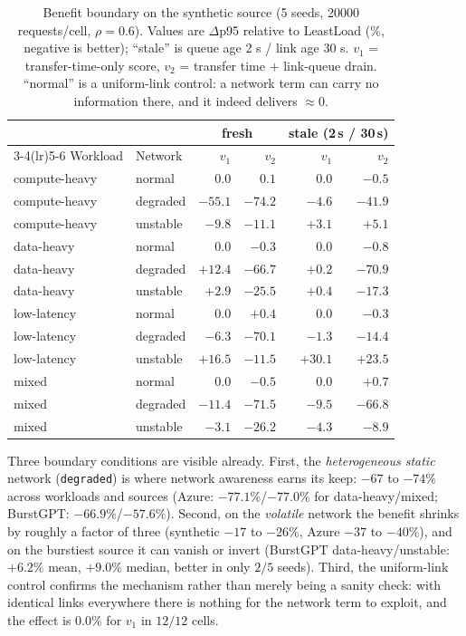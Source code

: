 \begin{table}[t]
\centering
\caption{Benefit boundary on the synthetic source (5 seeds, 20000 requests/cell,
$\rho=0.6$). Values are $\Delta$p95 relative to LeastLoad (\%, negative is better);
``stale'' is queue age 2 s / link age 30 s. $v_1$ = transfer-time-only
score, $v_2$ = transfer time $+$ link-queue drain. ``normal'' is a uniform-link control: a
network term can carry no information there, and it indeed delivers $\approx0$.}
\label{tab:rq1main}
\small
\begin{tabular}{@{}llrrrr@{}}
\toprule
& & \multicolumn{2}{c}{fresh} & \multicolumn{2}{c}{stale (2\,s / 30\,s)} \\
\cmidrule(lr){3-4}\cmidrule(lr){5-6}
Workload & Network & $v_1$ & $v_2$ & $v_1$ & $v_2$ \\
\midrule
compute-heavy & normal   & $0.0$   & $0.1$   & $0.0$   & $-0.5$ \\
compute-heavy & degraded & $-55.1$ & $-74.2$ & $-4.6$  & $-41.9$ \\
compute-heavy & unstable & $-9.8$  & $-11.1$ & $+3.1$  & $+5.1$ \\
data-heavy    & normal   & $0.0$   & $-0.3$  & $0.0$   & $-0.8$ \\
data-heavy    & degraded & $\mathbf{+12.4}$ & $\mathbf{-66.7}$ & $+0.2$ & $-70.9$ \\
data-heavy    & unstable & $+2.9$  & $-25.5$ & $+0.4$  & $-17.3$ \\
low-latency   & normal   & $0.0$   & $+0.4$  & $0.0$   & $-0.3$ \\
low-latency   & degraded & $-6.3$  & $-70.1$ & $-1.3$  & $-14.4$ \\
low-latency   & unstable & $+16.5$ & $-11.5$ & $+30.1$ & $+23.5$ \\
mixed         & normal   & $0.0$   & $-0.5$  & $0.0$   & $+0.7$ \\
mixed         & degraded & $-11.4$ & $-71.5$ & $-9.5$  & $-66.8$ \\
mixed         & unstable & $-3.1$  & $-26.2$ & $-4.3$  & $-8.9$ \\
\bottomrule
\end{tabular}
\end{table}

Three boundary conditions are visible already. First, the \emph{heterogeneous static} network
(\texttt{degraded}) is where network awareness earns its keep: $-67$ to $-74\%$ across workloads
and sources (Azure: $-77.1\%$/$-77.0\%$ for data-heavy/mixed; BurstGPT: $-66.9\%$/$-57.6\%$).
Second, on the \emph{volatile} network the benefit shrinks by roughly a factor of three
(synthetic $-17$ to $-26\%$, Azure $-37$ to $-40\%$), and on the burstiest source it can vanish
or invert (BurstGPT data-heavy/unstable: $+6.2\%$ mean, $+9.0\%$ median, better in only $2/5$
seeds). Third, the uniform-link control confirms the mechanism rather than merely being a
sanity check: with identical links everywhere there is nothing for the network term to
exploit, and the effect is $0.0\%$ for $v_1$ in $12/12$ cells.


